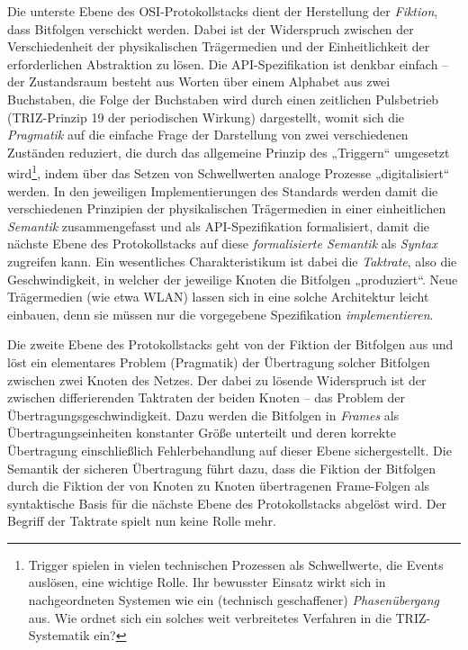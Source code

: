 \documentclass[11pt,a4paper]{article}
\begin{document}
Die unterste Ebene des OSI-Protokollstacks dient der Herstellung der
\emph{Fiktion}, dass Bitfolgen verschickt werden.  Dabei ist der Widerspruch
zwischen der Verschiedenheit der physikalischen Trägermedien und der
Einheitlichkeit der erforderlichen Abstraktion zu lösen. Die API-Spezifikation
ist denkbar einfach -- der Zustandsraum besteht aus Worten über einem Alphabet
aus zwei Buchstaben, die Folge der Buchstaben wird durch einen zeitlichen
Pulsbetrieb (TRIZ-Prinzip 19 der periodischen Wirkung) dargestellt, womit sich
die \emph{Pragmatik} auf die einfache Frage der Darstellung von zwei
verschiedenen Zuständen reduziert, die durch das allgemeine Prinzip des
„Triggern“ umgesetzt wird\footnote{Trigger spielen in vielen technischen
  Prozessen als Schwellwerte, die Events auslösen, eine wichtige Rolle. Ihr
  bewusster Einsatz wirkt sich in nachgeordneten Systemen wie ein (technisch
  geschaffener) \emph{Phasenübergang} aus.  Wie ordnet sich ein solches weit
  verbreitetes Verfahren in die TRIZ-Systematik ein?}, indem über das Setzen
von Schwellwerten analoge Prozesse „digitalisiert“ werden.  In den jeweiligen
Implementierungen des Standards werden damit die verschiedenen Prinzipien der
physikalischen Trägermedien in einer einheitlichen \emph{Semantik}
zusammengefasst und als API-Spezifikation formalisiert, damit die nächste
Ebene des Protokollstacks auf diese \emph{formalisierte Semantik} als
\emph{Syntax} zugreifen kann. Ein wesentliches Charakteristikum ist dabei die
\emph{Taktrate}, also die Geschwindigkeit, in welcher der jeweilige Knoten die
Bitfolgen „produziert“.  Neue Trägermedien (wie etwa WLAN) lassen sich in eine
solche Architektur leicht einbauen, denn sie müssen nur die vorgegebene
Spezifikation \emph{implementieren}.

Die zweite Ebene des Protokollstacks geht von der Fiktion der Bitfolgen aus
und löst ein elementares Problem (Pragmatik) der Übertragung solcher Bitfolgen
zwischen zwei Knoten des Netzes.  Der dabei zu lösende Widerspruch ist der
zwischen differierenden Taktraten der beiden Knoten -- das Problem der
Übertragungsgeschwindigkeit.  Dazu werden die Bitfolgen in \emph{Frames} als
Übertragungseinheiten konstanter Größe unterteilt und deren korrekte
Übertragung einschließlich Fehlerbehandlung auf dieser Ebene sichergestellt.
Die Semantik der sicheren Übertragung führt dazu, dass die Fiktion der
Bitfolgen durch die Fiktion der von Knoten zu Knoten übertragenen Frame-Folgen
als syntaktische Basis für die nächste Ebene des Protokollstacks abgelöst
wird.  Der Begriff der Taktrate spielt nun keine Rolle mehr. 
\end{document}
